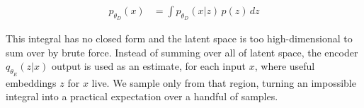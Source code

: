 \begin{align*}
    p_{\theta_D}(x) &= \int p_{\theta_D}(x|z)\, p(z) \, dz
\end{align*}


This integral has no closed form and the latent space is too high-dimensional to sum over by brute force.
Instead of summing over all of latent space, the encoder $q_{\theta_E}(z|x)$ output is used as an estimate, for each input $x$, 
where useful embeddings $z$ for $x$ live. 
We sample only from that region\cite{KingmaWelling2014}, turning an impossible integral
into a practical expectation over a handful of samples.


